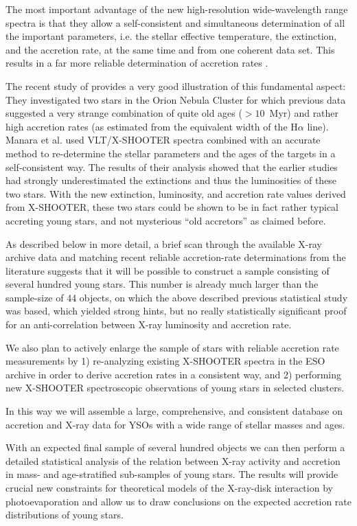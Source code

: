 \documentclass[10pt,fleqn,twoside]{article}
\begin{document}
The most important advantage of the new high-resolution wide-wavelength range
spectra is that they allow a self-consistent and simultaneous
determination of all the important parameters,  i.e. the
stellar effective temperature, the extinction, and the accretion rate, at the same time and
from one coherent data set.
This results in a far more reliable determination of accretion rates \citep[see][]{MT14}.



The recent study of \citet{Manara13} 
provides a very good illustration of this
fundamental aspect: They investigated two stars in the Orion Nebula Cluster
for which previous data suggested a very strange combination 
of quite old ages ($> 10$~Myr)
and rather high accretion rates (as estimated from the equivalent width
of the H$\alpha$ line).
Manara et al. used  VLT/X-SHOOTER spectra combined
 with an accurate method to re-determine the stellar parameters and the ages of the targets in a 
self-consistent way.
The results of their analysis showed that the earlier
studies had strongly underestimated the extinctions and thus the luminosities
of these two stars. With the new extinction, luminosity, and accretion rate
values derived from X-SHOOTER, these two stars could be shown to be in fact
rather typical accreting young  stars, and not mysterious ``old accretors'' as claimed
before.

\medskip


As described below in more detail, a brief scan through
the available X-ray archive data and matching recent
reliable accretion-rate determinations from the literature
suggests that
it will be possible to construct a sample consisting of several
hundred
young stars.
This number is already much larger than the sample-size of 44
objects, on which the above described previous statistical 
study was based, which yielded strong hints, but no really 
statistically significant proof for an 
anti-correlation between X-ray luminosity and accretion rate.


We also plan to actively enlarge the sample of stars with 
reliable accretion rate measurements by 
%
1) re-analyzing existing X-SHOOTER spectra in the ESO archive
in order to derive accretion rates in a consistent way, and
%
2) performing new X-SHOOTER spectroscopic 
observations of young stars in selected clusters.

\begin{highlight}
In this way we will assemble a large, comprehensive, and consistent
database on accretion and X-ray data for YSOs with a wide range of
stellar masses and ages.
\end{highlight}
%
With an expected final sample of several hundred objects we can then perform a
 detailed statistical analysis
of the relation between X-ray activity and accretion in mass- and 
age-stratified sub-samples of young stars. 
The results will
provide crucial new
constraints for theoretical models of the X-ray-disk interaction 
by photoevaporation and allow us to
draw conclusions on the expected accretion rate distributions of 
young stars.
\end{document}
